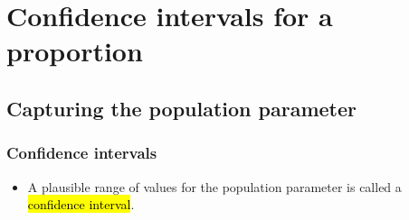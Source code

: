 \documentclass[notes,11pt, aspectratio=169]{beamer}
\begin{document}

\section{Confidence intervals for a proportion}


\subsection{Capturing the population parameter}


\begin{frame}[shrink]
\frametitle{Confidence intervals}

\begin{itemize}

\item A plausible range of values for the population parameter is called a \hl{confidence interval}.


\end{itemize}
\end{frame}
\end{document}
